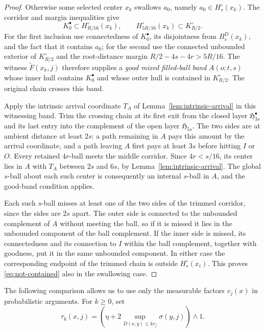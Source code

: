 \documentclass[11pt,reqno]{amsart}
\theoremstyle{plain}
\theoremstyle{definition}
\theoremstyle{remark}
\newcommand{\1}{\mathbf{1}}
\newcommand{\bd}{B^{D}}
\begin{document}
\begin{proof}
Otherwise some selected center $x_k$ swallows $a_0$, namely $a_0\in H_s^\circ(x_k)$. The corridor and margin inequalities give
\[
K_0^\bullet\subset H_{R/16}^\circ(x_k),\qquad
H_{5R/16}^\circ(x_k)\subset K_{R/2}^\circ.
\]
For the first inclusion use connectedness of $K_0^\bullet$, its disjointness from $\bd_s(x_k)$, and the fact that it contains $a_0$; for the second use the connected unbounded exterior of $K_{R/2}^\circ$ and the root-distance margin $R/2-4s-4r>5R/16$. The witness $\widetilde F(x_k,j)$ therefore supplies a \emph{good mixed filled-ball band} $A(o;t,s)$ whose inner hull contains $K_0^\bullet$ and whose outer hull is contained in $K_{R/2}^\circ$. The original chain crosses this band.

Apply the intrinsic arrival coordinate $T_A$ of Lemma~\ref{lem:intrinsic-arrival} in this witnessing band. Trim the crossing chain at its first exit from the closed layer $\mathfrak H_{3s}^\bullet$ and its last entry into the complement of the open layer $\mathfrak H_{5s}$. The two sides are at ambient distance at least $2s$: a path remaining in $A$ pays this amount by the arrival coordinate, and a path leaving $A$ first pays at least $3s$ before hitting $I$ or $O$. Every retained $4r$-ball meets the middle corridor. Since $4r<s/16$, its center lies in $A$ with $T_A$ between $2s$ and $6s$, by Lemma~\ref{lem:intrinsic-arrival}. The global $s$-ball about each such center is consequently an internal $s$-ball in $A$, and the good-band condition applies.

Each such $s$-ball misses at least one of the two sides of the trimmed corridor, since the sides are $2s$ apart. The outer side is connected to the unbounded complement of $A$ without meeting the ball, so if it is missed it lies in the unbounded component of the ball complement. If the inner side is missed, its connectedness and its connection to $I$ within the ball complement, together with goodness, put it in the same unbounded component. In either case the corresponding endpoint of the trimmed chain is outside $H_s^\circ(x_i)$. This proves \eqref{eq:not-contained} also in the swallowing case.
\end{proof}

The following comparison allows us to use only the measurable factors $v_j(x)$ in probabilistic arguments. For $k\ge0$, set
\begin{equation}\label{eq:tau}
\tau_k(x,j)=\left(\eta+2\sup_{D(x,y)\le kr_j}\sigma(y,j)\right)\wedge1.
\end{equation}
\end{document}
